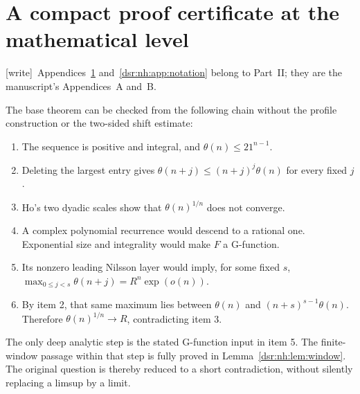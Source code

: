 \documentclass[11pt,a4paper]{article}
\numberwithin{equation}{section}
\theoremstyle{definition}
\theoremstyle{remark}
\newcommand{\wtag}{\textup{[write]}}
\newcommand{\tht}{\theta}
\theoremstyle{definition}
\theoremstyle{plain}
\begin{document}
\section{A compact proof certificate at the mathematical level}
\label{dsr:nh:app:compact}
\noindent\wtag\ Appendices~\ref{dsr:nh:app:compact}
and~\ref{dsr:nh:app:notation} belong to Part~II; they are the
manuscript's Appendices~A and~B.

The base theorem can be checked from the following chain without the
profile construction or the two-sided shift estimate:
\begin{enumerate}[label=\arabic*.,leftmargin=*,itemsep=5pt]
\item The sequence is positive and integral, and
$\tht(n)\le21^{n-1}$.
\item Deleting the largest entry gives
$\tht(n+j)\le(n+j)^j\tht(n)$ for every fixed $j$.
\item Ho's two dyadic scales show that $\tht(n)^{1/n}$ does not converge.
\item A complex polynomial recurrence would descend to a rational one.
Exponential size and integrality would make $F$ a G-function.
\item Its nonzero leading Nilsson layer would imply, for some fixed $s$,
$\max_{0\le j<s}\tht(n+j)=R^n\exp(o(n))$.
\item By item 2, that same maximum lies between $\tht(n)$ and
$(n+s)^{s-1}\tht(n)$. Therefore $\tht(n)^{1/n}\to R$, contradicting item 3.
\end{enumerate}
The only deep analytic step is the stated G-function input in item 5.
The finite-window passage within that step is fully proved in
Lemma~\ref{dsr:nh:lem:window}. The original question is thereby reduced to a
short contradiction, without silently replacing a limsup by a limit.
\end{document}

